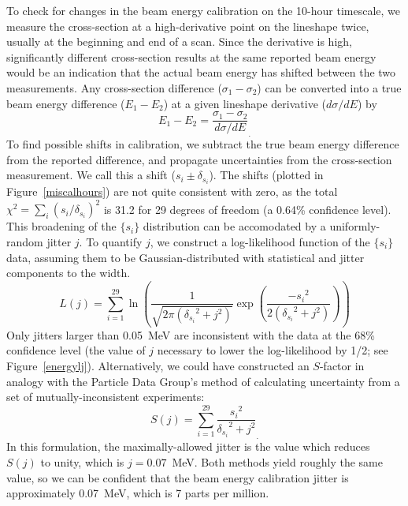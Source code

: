 \documentclass{cornell}
\begin{document}
To check for changes in the beam energy calibration on the
10-hour timescale, we measure the cross-section at a high-derivative
point on the lineshape twice, usually at the beginning and end of a
scan.  Since the derivative is high, significantly different
cross-section results at the same reported beam energy would be an
indication that the actual beam energy has shifted between the two
measurements.  Any cross-section difference ($\sigma_1-\sigma_2$) can
be converted into a true beam energy difference ($E_1-E_2$) at a given
lineshape derivative ($d\sigma/dE$) by
\begin{equation}
  \left. E_1 - E_2 = \frac{\sigma_1 - \sigma_2}{d\sigma/dE} \right._{\mbox{.}}
\end{equation}
To find possible shifts in calibration, we subtract the true beam
energy difference from the reported difference, and propagate
uncertainties from the cross-section measurement.  We call this a
shift ($s_i \pm \delta_{s_i}$).  The shifts (plotted in
Figure~\ref{miscalhours}) are not quite consistent with zero, as the
total $\chi^2 = \sum_i (s_i/\delta_{s_i})^2$ is 31.2 for 29 degrees of
freedom (a 0.64\% confidence level).  This broadening of the $\{s_i\}$
distribution can be accomodated by a uniformly-random jitter $j$.  To
quantify $j$, we construct a log-likelihood function of the $\{s_i\}$
data, assuming them to be Gaussian-distributed with statistical and
jitter components to the width.
\begin{equation}
  L(j) = \sum_{i=1}^{29} \ln \left(
  \frac{1}{\sqrt{2\pi({\delta_{s_i}}^2 + j^2)}} \exp\left(\frac{-{s_i}^2}{2
  ({\delta_{s_i}}^2 + j^2)} \right) \right)
\end{equation}
Only jitters larger than 0.05~MeV are inconsistent with the data at
the 68\% confidence level (the value of $j$ necessary to lower the
log-likelihood by 1/2; see Figure~\ref{energylj}).  Alternatively, we
could have constructed an $S$-factor in analogy with the Particle Data
Group's method of calculating uncertainty from a set of
mutually-inconsistent experiments:
\begin{equation}
  \left. S(j) = \sum_{i=1}^{29} \frac{{s_i}^2}{{\delta_{s_i}}^2 + j^2} \right._{\mbox{.}}
\end{equation}
In this formulation, the maximally-allowed jitter is the value which
reduces $S(j)$ to unity, which is $j=0.07$~MeV.  Both methods yield
roughly the same value, so we can be confident that the beam energy
calibration jitter is approximately 0.07~MeV, which is 7 parts per
million.
\end{document}

